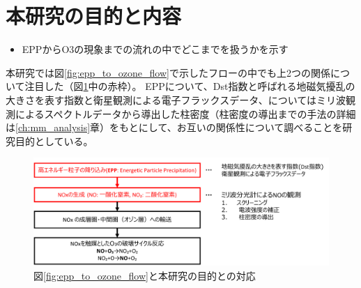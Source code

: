 \section{本研究の目的と内容}
\label{sec:intro_porpose}
\begin{itemize}
    \item EPPからO3の現象までの流れの中でどこまでを扱うかを示す
\end{itemize}
本研究では図\ref{fig:epp_to_ozone_flow}で示したフローの中でも上2つの関係について注目した（図\ref{fig:flow_and_porpose}中の赤枠）。
EPPについて、Dst指数と呼ばれる地磁気擾乱の大きさを表す指数と衛星観測による電子フラックスデータ、についてはミリ波観測によるスペクトルデータから導出した柱密度（柱密度の導出までの手法の詳細は\ref{ch:mm_analysis}章）をもとにして、お互いの関係性について調べることを研究目的としている。
\begin{figure}[htbp]
    \centering
    \includegraphics[width=\linewidth]{master_thesis_contents/master_thesis_fig/flow_and_porpose.pdf}
    \caption{図\ref{fig:epp_to_ozone_flow}と本研究の目的との対応}
    \label{fig:flow_and_porpose}
\end{figure}

